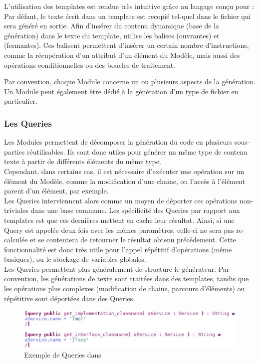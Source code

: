 L'utilisation des templates est rendue très intuitive grâce au langage conçu pour \kwacceleo{} : Par défaut, le texte écrit dans un template est recopié tel-quel dans le fichier qui sera généré en sortie. Afin d'insérer du contenu dynamique (base de la génération) dans le texte du template, \kwacceleo{} utilise les balises \guim{\textbf{[}} (ouvrantes) et \guim{\textbf{/]}} (fermantes). Ces balisent permettent d'insérer un certain nombre d'instructions, comme la récupération d'un attribut d'un élément du Modèle, mais aussi des opérations conditionnelles ou des boucles de traitement.

Par convention, chaque Module concerne un ou plusieurs aspects de la génération. Un Module peut également être dédié à la génération d'un type de fichier en particulier.



\subsubsection{Les Queries}

Les Modules permettent de décomposer la génération du code en plusieurs sous-parties réutilisables. Ils sont donc utiles pour générer un même type de contenu texte à partir de différents éléments du même type.\\
Cependant, dans certains cas, il est nécessaire d'exécuter une opération sur un élément du Modèle, comme la modification d'une chaine, ou l'accès à l'élément parent d'un élément, par exemple.\\
Les Queries interviennent alors comme un moyen de déporter ces opérations non-triviales dans une base commune. Les spécificité des Queries par rapport aux templates est que ces dernières mettent en cache leur résultat. Ainsi, si une Query est appelée deux fois avec les mêmes paramètres, celle-ci ne sera pas re-calculée et se contentera de retourner le résultat obtenu précédement. Cette fonctionnalité est donc très utile pour l'appel répétitif d'opérations (même basiques), ou le stockage de variables globales.\\
Les Queries permettent plus généralement de structure le générateur. Par convention, les générations de texte sont traitées dans des templates, tandis que les opérations plus complexes (modification de chaine, parcours d'éléments) ou répétitive sont déportées dans des Queries.

\begin{figure}[htb]
  \centering
  \includegraphics[scale=0.6]{img/screen_query.eps}
  \caption{Exemple de Queries dans \kwacceleo{}}
  \label{fig:acc_module}
\end{figure}

